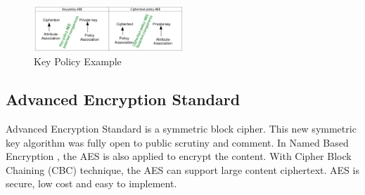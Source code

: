 \begin{figure}
	\centering
	\includegraphics[width=0.5\textwidth]{Figures/KPandCPABE.png}
	\caption{Key Policy Example}
	\label{fig:KPandCPABE}
\end{figure}

\subsection{Advanced Encryption Standard}
Advanced Encryption Standard is a symmetric block cipher. This new symmetric key algorithm was fully open to public scrutiny and comment. In Named Based Encryption \cite{yu2015name}, the AES is also applied to encrypt the content. With Cipher Block Chaining (CBC) technique, the AES can support large content ciphertext. AES is secure, low cost and easy to implement.

